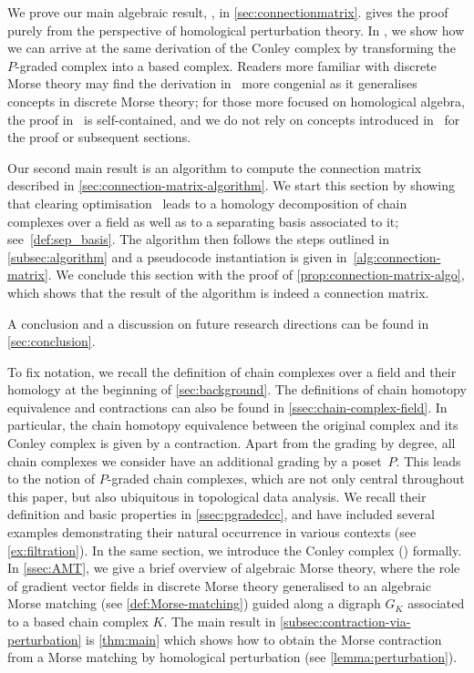 \documentclass[11pt, table, nothms]{amsart}
\theoremstyle{definition}
\begin{document}
We prove our main algebraic result, , in \cref{sec:connectionmatrix}.  gives the proof purely from the perspective of homological perturbation theory. In , we show how we can arrive at the same derivation of the Conley complex by transforming the $P$-graded complex into a based complex. Readers more familiar with discrete Morse theory may find the derivation in~ more congenial as it generalises concepts in discrete Morse theory; for those  more focused on homological algebra, the proof in~ is self-contained, and we do not rely on concepts introduced in~ for the proof or subsequent sections.


Our second main result is an algorithm to compute the connection matrix described in \cref{sec:connection-matrix-algorithm}. 
We start this section by showing that clearing optimisation~\cite{Chen2011, Bauer2014ClearChunks} leads to a homology decomposition of chain complexes over a field as well as to a separating basis associated to it; see~\cref{def:sep_basis}.
The algorithm then follows the steps outlined in \cref{subsec:algorithm} and a pseudocode instantiation is given in~\cref{alg:connection-matrix}.
We conclude this section with the proof of \cref{prop:connection-matrix-algo}, which shows that the result of the algorithm is indeed a connection matrix. 

A conclusion and a discussion on future research directions can be found in \cref{sec:conclusion}.



\iffalse
To fix notation, we recall the definition of chain complexes over a field and their homology at the beginning of \cref{sec:background}. 
{The definitions of chain homotopy equivalence and contractions can also be found in \cref{ssec:chain-complex-field}. 
In particular, the} chain homotopy equivalence between the original complex and its Conley complex is given by a contraction. Apart from the grading by degree, all chain complexes we consider have an additional grading by a poset~$P$. 
This leads to the notion of $P$-graded chain complexes, which are not only central throughout this paper, but also ubiquitous in topological data analysis. We recall their definition and basic properties in \cref{ssec:pgradedcc}, and have included several examples demonstrating their natural occurrence in various contexts (see \cref{ex:filtration}). In the same section, we introduce the Conley complex () formally. 
In \cref{ssec:AMT}, we give a brief overview of algebraic Morse theory, where the role of gradient vector fields in discrete Morse theory generalised to an algebraic Morse matching (see \cref{def:Morse-matching}) guided along  a digraph $G_K$ associated to a based chain complex $K$. The main result in \cref{subsec:contraction-via-perturbation} is \cref{thm:main} which shows how to obtain the Morse contraction from a Morse matching by homological perturbation (see \cref{lemma:perturbation}).
\end{document}
